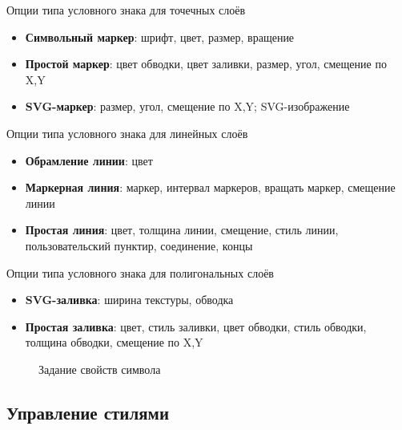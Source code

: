 \begin{description}
\item Опции типа условного знака для точечных слоёв
\begin{itemize}[label=--]
\item \textbf{Символьный маркер}: шрифт, цвет, размер, вращение
\item \textbf{Простой маркер}: цвет обводки, цвет заливки, размер, угол,
смещение по X,Y
\item \textbf{SVG-маркер}: размер, угол, смещение по X,Y; SVG-изображение
\end{itemize}
\item Опции типа условного знака для линейных слоёв
\begin{itemize}[label=--]
\item \textbf{Обрамление линии}: цвет
\item \textbf{Маркерная линия}: маркер, интервал маркеров, вращать
маркер, смещение линии
\item \textbf{Простая линия}: цвет, толщина линии, смещение, стиль
линии, пользовательский пунктир, соединение, концы
\end{itemize}
\item Опции типа условного знака для полигональных слоёв
\begin{itemize}[label=--]
\item \textbf{SVG-заливка}: ширина текстуры, обводка
\item \textbf{Простая заливка}: цвет, стиль заливки, цвет обводки,
стиль обводки, толщина обводки, смещение по X,Y
\end{itemize}
\end{description}


\begin{figure}[ht]
\centering
   \hspace{1cm}
   \hspace{1cm}
\caption{Задание свойств символа \wincaption}
\end{figure}

\subsection{Управление стилями}\label{subsec:stylemanager}

